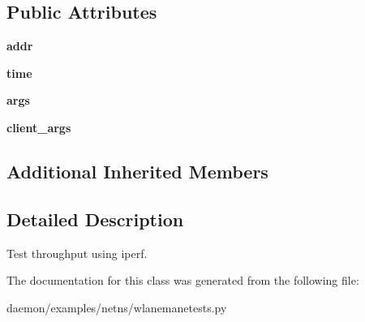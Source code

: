 \subsection*{Public Attributes}
\begin{DoxyCompactItemize}
\item 
\hypertarget{classwlanemanetests_1_1_iperf_cmd_a8c25039b53a470a55a11d673698b2930}{{\bfseries addr}}\label{classwlanemanetests_1_1_iperf_cmd_a8c25039b53a470a55a11d673698b2930}

\item 
\hypertarget{classwlanemanetests_1_1_iperf_cmd_a1b7532e7dc43b230169c6e3d8df25913}{{\bfseries time}}\label{classwlanemanetests_1_1_iperf_cmd_a1b7532e7dc43b230169c6e3d8df25913}

\item 
\hypertarget{classwlanemanetests_1_1_iperf_cmd_a7785961da75c3d4c2bb2bd4288937e74}{{\bfseries args}}\label{classwlanemanetests_1_1_iperf_cmd_a7785961da75c3d4c2bb2bd4288937e74}

\item 
\hypertarget{classwlanemanetests_1_1_iperf_cmd_af199ceb65998be327c38ebe1fd294c1d}{{\bfseries client\+\_\+args}}\label{classwlanemanetests_1_1_iperf_cmd_af199ceb65998be327c38ebe1fd294c1d}

\end{DoxyCompactItemize}
\subsection*{Additional Inherited Members}


\subsection{Detailed Description}
\begin{DoxyVerb}Test throughput using iperf.
\end{DoxyVerb}
 

The documentation for this class was generated from the following file\+:\begin{DoxyCompactItemize}
\item 
daemon/examples/netns/wlanemanetests.\+py\end{DoxyCompactItemize}
